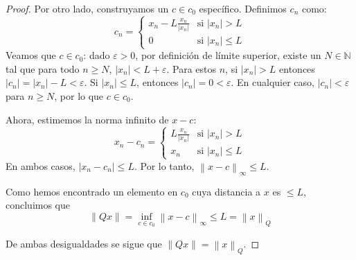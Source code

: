 \documentclass{article}
\theoremstyle{definition}
\newcommand{\N}{\mathbb{N}}
\newcommand{\norm}[1]{\left\lVert #1 \right\rVert}       %
\begin{document}
\begin{proof}
    Por otro lado, construyamos un \( c \in c_0 \) específico. Definimos \( c_n \) como:
    \[
        c_n = \begin{cases}
            x_n - L \frac{x_n}{|x_n|} & \text{si } |x_n| > L   \\
            0                         & \text{si } |x_n| \le L
        \end{cases}
    \]
    Veamos que \( c \in c_0 \): dado \( \varepsilon > 0 \), por definición de límite superior, existe un \( N \in \N \) tal que para todo \( n \ge N \), \( |x_n| < L + \varepsilon \).
    Para estos \( n \), si \( |x_n| > L \) entonces \( |c_n| = |x_n| - L < \varepsilon \). Si \( |x_n| \le L \), entonces \( |c_n| = 0 < \varepsilon \). En cualquier caso, \( |c_n| < \varepsilon \) para \( n \ge N \), por lo que \( c \in c_0 \).

    Ahora, estimemos la norma infinito de \( x - c \):
    \[
        x_n - c_n = \begin{cases}
            L \frac{x_n}{|x_n|} & \text{si } |x_n| > L   \\
            x_n                 & \text{si } |x_n| \le L
        \end{cases}
    \]
    En ambos casos, \( |x_n - c_n| \le L \). Por lo tanto, \( \norm{x - c}_\infty \le L \).

    Como hemos encontrado un elemento en \( c_0 \) cuya distancia a \( x \) es \( \le L \), concluimos que \[ \norm{Qx} = \inf_{c \in c_0} \norm{x - c}_\infty \le L = \norm{x}_Q \]

    De ambas desigualdades se sigue que \( \norm{Qx} = \norm{x}_Q \).
\end{proof}

\vspace{0.5cm}
\end{document}
